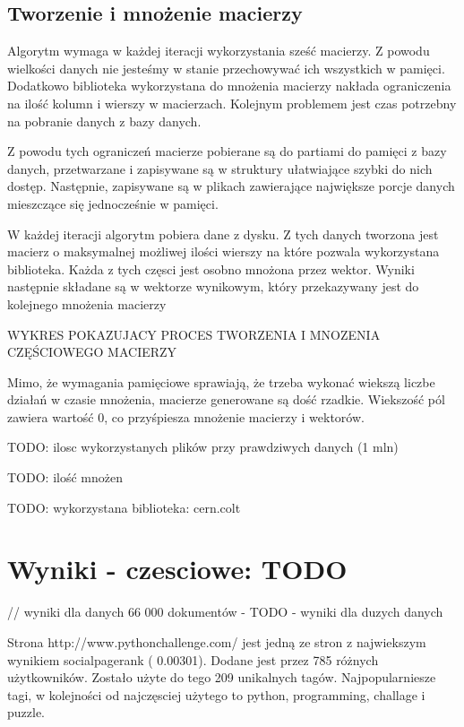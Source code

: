 \subsection{Tworzenie i mnożenie macierzy}

Algorytm wymaga w każdej iteracji wykorzystania sześć macierzy. Z powodu wielkości danych nie jesteśmy w stanie przechowywać ich wszystkich w pamięci. Dodatkowo biblioteka wykorzystana do mnożenia macierzy nakłada ograniczenia na ilość kolumn i wierszy w macierzach. Kolejnym problemem jest czas potrzebny na pobranie danych z bazy danych.

Z powodu tych ograniczeń macierze pobierane są do partiami do pamięci z bazy danych, przetwarzane i zapisywane są w struktury ułatwiające szybki do nich dostęp. Następnie, zapisywane są w plikach zawierające największe porcje danych mieszczące się jednocześnie w pamięci.

W każdej iteracji algorytm pobiera dane z dysku. Z tych danych tworzona jest macierz o maksymalnej możliwej ilości wierszy na które pozwala wykorzystana biblioteka. Każda z tych częsci jest osobno mnożona przez wektor. Wyniki następnie składane są w wektorze wynikowym, który przekazywany jest do kolejnego mnożenia macierzy

WYKRES POKAZUJACY PROCES TWORZENIA I MNOZENIA CZĘŚCIOWEGO MACIERZY



Mimo, że wymagania pamięciowe sprawiają, że trzeba wykonać wiekszą liczbe działań w czasie mnożenia, macierze generowane są dość rzadkie. Wiekszość pól zawiera wartość 0, co przyśpiesza mnożenie macierzy i wektorów.

TODO: ilosc wykorzystanych plików przy prawdziwych danych (1 mln)

TODO: ilość mnożen 

TODO: wykorzystana biblioteka: cern.colt


\section{Wyniki - czesciowe: TODO}

// wyniki dla danych 66 000 dokumentów - TODO - wyniki dla duzych danych

Strona http://www.pythonchallenge.com/ jest jedną ze stron z najwiekszym wynikiem socialpagerank ( 0.00301). Dodane jest przez 785 różnych użytkowników. Zostało użyte do tego 209 unikalnych tagów. Najpopularniesze tagi, w kolejności od najczęsciej użytego to python, programming, challage i puzzle.

